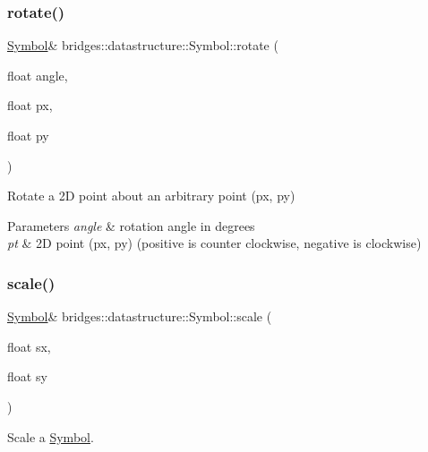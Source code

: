 \subsubsection{\texorpdfstring{rotate()}{rotate()}\hspace{0.1cm}{\footnotesize\ttfamily [2/2]}}
{\footnotesize\ttfamily \hyperlink{classbridges_1_1datastructure_1_1_symbol}{Symbol}\& bridges\+::datastructure\+::\+Symbol\+::rotate (\begin{DoxyParamCaption}\item[{float}]{angle,  }\item[{float}]{px,  }\item[{float}]{py }\end{DoxyParamCaption})\hspace{0.3cm}{\ttfamily [inline]}}



Rotate a 2D point about an arbitrary point (px, py) 


\begin{DoxyParams}{Parameters}
{\em angle} & rotation angle in degrees \\
\hline
{\em pt} & 2D point (px, py) (positive is counter clockwise, negative is clockwise) \\
\hline
\end{DoxyParams}
\mbox{\label{classbridges_1_1datastructure_1_1_symbol_a3801b726e1d6bacd4706fe8b5466b8e6}} 
\subsubsection{\texorpdfstring{scale()}{scale()}\hspace{0.1cm}{\footnotesize\ttfamily [1/3]}}
{\footnotesize\ttfamily \hyperlink{classbridges_1_1datastructure_1_1_symbol}{Symbol}\& bridges\+::datastructure\+::\+Symbol\+::scale (\begin{DoxyParamCaption}\item[{float}]{sx,  }\item[{float}]{sy }\end{DoxyParamCaption})\hspace{0.3cm}{\ttfamily [inline]}}



Scale a \hyperlink{classbridges_1_1datastructure_1_1_symbol}{Symbol}. 


